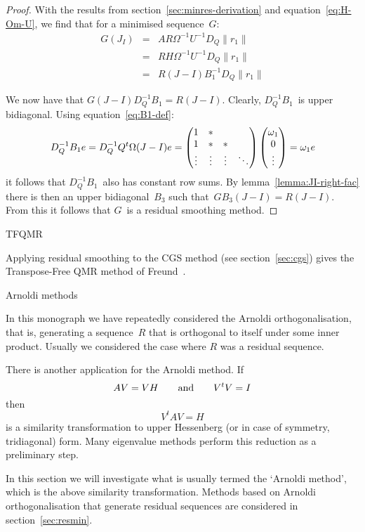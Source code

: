 \documentclass[11pt]{artikel3}
\begin{document}
\begin{Outline}
\begin{proof}
With the results from section~\ref{sec:minres-derivation}
and equation~\ref{eq:H-Om-U},
we find that for a minimised sequence~$G$:
\begin{eqnarray*} G(J_I)
        &=& AR\Omega^{-1}U^{-1}D_Q\|r_1\| \\
        &=& RH\Omega^{-1}U^{-1}D_Q\|r_1\| \\
        &=& R(J-I)B_1^{-1}D_Q\|r_1\|
        \end{eqnarray*}

We now have that
$G(J-I)D_Q^{-1}B_1=R(J-I)$. Clearly, $D_Q^{-1}B_1$~is upper bidiagonal.
Using equation~\ref{eq:B1-def}:
\[ D_Q^{-1}B_1e=D_Q^{-1}Q^t\Omega(J-I)e =
        \begin{pmatrix}1&*\cr 1&*&*\cr \vdots&\vdots&\vdots&\ddots\cr\end{pmatrix}
                \begin{pmatrix}\omega_1\cr 0\cr \vdots\cr\end{pmatrix} =
        \omega_1e \]
it follows that $D_Q^{-1}B_1$~also has constant row sums.
By lemma~\ref{lemma:JI-right-fac} there is then an upper bidiagonal~$B_3$
such that~$GB_3(J-I)=R(J-I)$. From this it follows that $G$~is a 
residual smoothing method.\end{proof}


 {TFQMR}

Applying residual smoothing to the CGS method (see section~\ref{sec:cgs})
gives the Transpose-Free QMR method of Freund~\cite{Fr:tfqmr}.



 {Arnoldi methods}

In this monograph we have repeatedly considered the Arnoldi
orthogonalisation, that is, generating a sequence~$R$ that
is orthogonal to itself under some inner product.
Usually we considered the case where $R$ was a residual sequence.

There is another application for the Arnoldi method. If
\[ AV=VH\qquad\hbox{and}\qquad V^tV=I \]
then
\begin{equation} V^tAV=H \label{eq:arnoldi-sim}\end{equation}
is a similarity transformation to upper Hessenberg
(or in case of symmetry, tridiagonal)
form. Many eigenvalue methods perform this reduction as
a preliminary step.

In this section we  will investigate
what is usually termed the `Arnoldi method', which is the above similarity
transformation.
Methods based
on Arnoldi orthogonalisation that generate residual sequences
are considered in section~\ref{sec:resmin}.


\end{Outline}
\end{document}

